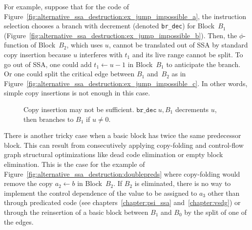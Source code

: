 For example, suppose that for the code of Figure~\ref{fig:alternative_ssa_destruction:ex_jump_impossible_a}, the instruction selection chooses a branch with decrement (denoted \texttt{br\_dec}) for Block~$B_1$ (Figure~\ref{fig:alternative_ssa_destruction:ex_jump_impossible_b}). 
Then, the $\phi$-function of Block~$B_2$, which uses $u$, cannot be translated out of SSA by standard copy insertion because $u$ interferes with $t_1$ and its live range cannot be split. 
To go out of SSA, one could add $t_1\gets u-1$ in Block~$B_1$ to anticipate the branch. 
Or one could split the critical edge between $B_1$ and~$B_2$ as in Figure~\ref{fig:alternative_ssa_destruction:ex_jump_impossible_c}. 
In other words, simple copy insertions is not enough in this case.

\begin{figure}[h]
\hfill
{}
\hfill
{}
\caption{Copy insertion may not be sufficient. $\texttt{br\_dec}\ u,B_1$ decrements $u$, then branches to $B_1$ if $u\neq 0$.\label{fig:alternative_ssa_destruction:ex_jump_impossible}}
\end{figure}

There is another tricky case when a basic block has twice the same predecessor block. 
This can result from consecutively applying copy-folding and control-flow graph structural optimizations like dead code elimination or empty block elimination. 
This is the case for the example of Figure~\ref{fig:alternative_ssa_destruction:doublepreds} where copy-folding would remove the copy $a_2\gets b$ in Block~$B_2$. 
If $B_2$ is eliminated, there is no way to implement the control dependence of the value to be assigned to $a_3$ other than through predicated code (see chapters~\ref{chapter:psi_ssa} and~\ref{chapter:vsdg}) or through the reinsertion of a basic block between $B_1$ and $B_0$ by the split of one of the edges.

